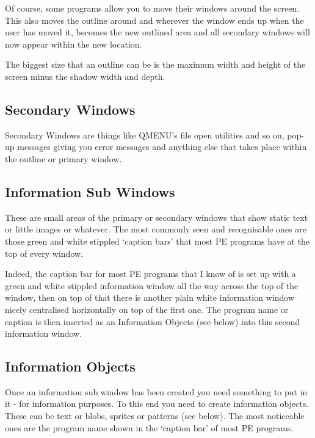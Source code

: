Of course, some programs allow you to move their windows around
      the screen. This also moves the outline around and wherever the window
      ends up when the user has moved it, becomes the new outlined area and
      all secondary windows will now appear within the new location.

The biggest size that an outline can be is the maximum width and
      height of the screen minus the shadow width and depth.

\subsection{Secondary Windows}
\label{ch22-sec-win}%

Secondary Windows are things like QMENU's file open utilities
      and so on, pop-{}up messages giving you error messages and anything else
      that takes place within the outline or primary window.

\subsection{Information Sub Windows}
\label{ch22-sub-win}%

These are small areas of the primary or secondary windows that
      show static text or little images or whatever. The most commonly seen
      and recognisable ones are those green and white stippled `caption bars'
      that most PE programs have at the top of every window.

Indeed, the caption bar for most PE programs that I know of is set
      up with a green and white stippled information window all the way across
      the top of the window, then on top of that there is another plain white
      information window nicely centralised horizontally on top of the first
      one. The program name or caption is then inserted as an Information
      Objects (see below) into this second information window.

\subsection{Information Objects}
\label{ch22-info-obj}%

Once an information sub window has been created you need something
      to put in it -{} for information purposes. To this end you need to create
      information objects. These can be text or blobs, sprites or patterns
      (see below). The most noticeable ones are the program name shown in the
      `caption bar' of most PE programs.

